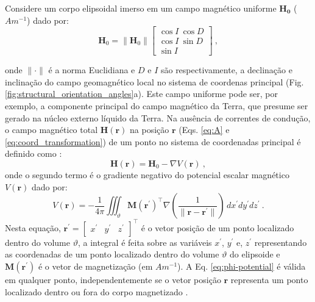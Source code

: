 Considere um corpo elipsoidal imerso em um campo magnético uniforme $\mathbf{{H}_{0}}$ ($\unit{Am^{-1}}$) dado por:
\begin{equation}
\mathbf{H}_{0} = \| \mathbf{H}_{0} \| \left[
\begin{array}{c}
\cos I \: \cos D \\
\cos I \: \sin D \\
\sin I
\end{array}
\right] \: ,
\label{eq:H0}
\end{equation}

onde $\| \cdot \|$ é a norma Euclidiana e $D$ e $I$ são respectivamente, a declinação e inclinação do campo geomagnético local no sistema de coordenas principal (Fig. \ref{fig:structural_orientation_angles}a). Este campo uniforme pode ser, por exemplo, a componente principal do campo magnético da Terra, que presume ser gerado na núcleo externo líquido da Terra. Na ausência de correntes de condução, o campo magnético total $\mathbf{H}(\mathbf{r})$ na posição $\mathbf{r}$ (Eqs. \ref{eq:A} e
\ref{eq:coord_transformation}) de um ponto no sistema de coordenadas principal é definido como \citep{sharma1966, eskola1980, reitz1992, sttraton2007}:
\begin{equation}
\mathbf{H}(\mathbf{r}) = \mathbf{H}_{0} - \nabla V(\mathbf{r}) \: ,
\label{eq:H}
\end{equation}
onde o segundo termo é o gradiente negativo do potencial escalar magnético $V(\mathbf{r})$ dado por:
\begin{equation}
V(\mathbf{r}) = -\frac{1}{4\pi} \iiint_{\vartheta} 
\mathbf{M}(\mathbf{r}^{\prime})^{\top} 
\nabla \left(
\frac{1}{\| \mathbf{r} - \mathbf{r}^{\prime} \|}
\right) \, dx^{\prime}dy^{\prime}dz^{\prime} \: .
\label{eq:phi-potential}
\end{equation}
Nesta equação, $\mathbf{r}^{\prime} = [\begin{array}{ccc} 
x^{\prime} & y^{\prime} & z^{\prime} \end{array} ]^{\top}$
é o vetor posição de um ponto localizado dentro do volume $\vartheta$, 
a integral é feita sobre as variáveis $x^{\prime}$, $y^{\prime}$ e, 
$z^{\prime}$ representando as coordenadas de um ponto localizado dentro do volume $\vartheta$ do elipsoide e 
$\mathbf{M}(\mathbf{r}^{\prime})$ é o vetor de magnetização
(em $\unit{Am^{-1}}$).
A Eq. \ref{eq:phi-potential} é válida em qualquer ponto, 
independentemente se o vetor posição $\mathbf{r}$ representa
um ponto localizado dentro ou fora do corpo magnetizado \citep{dubois1896}.

